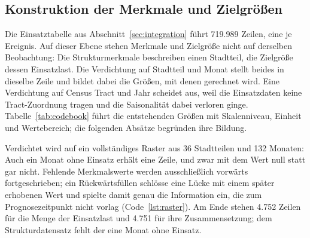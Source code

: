 \documentclass[12pt,a4paper]{article}
\begin{document}

\subsection{Konstruktion der Merkmale und Zielgrößen}
\label{sec:merkmale}
Die Einsatztabelle aus Abschnitt~\ref{sec:integration} führt 719.989 Zeilen,
eine je Ereignis. Auf dieser Ebene stehen Merkmale und Zielgröße nicht auf
derselben Beobachtung: Die Strukturmerkmale beschreiben einen Stadtteil, die
Zielgröße dessen Einsatzlast. Die Verdichtung auf Stadtteil und Monat stellt
beides in dieselbe Zeile und bildet dabei die Größen, mit denen gerechnet wird.
Eine Verdichtung auf Census Tract und Jahr scheidet aus, weil die Einsatzdaten
keine Tract-Zuordnung tragen und die Saisonalität dabei verloren ginge.
Tabelle~\ref{tab:codebook} führt die entstehenden Größen mit Skalenniveau,
Einheit und Wertebereich; die folgenden Absätze begründen ihre Bildung.
 
Verdichtet wird auf ein vollständiges Raster aus 36 Stadtteilen und 132
Monaten: Auch ein Monat ohne Einsatz erhält eine Zeile, und zwar mit dem Wert
null statt gar nicht. Fehlende Merkmalswerte werden ausschließlich vorwärts
fortgeschrieben; ein Rückwärtsfüllen schlösse eine Lücke mit einem später
erhobenen Wert und spielte damit genau die Information ein, die zum
Prognosezeitpunkt nicht vorlag (Code~\ref{lst:raster}). Am Ende stehen
4.752 Zeilen für die Menge der Einsatzlast und
4.751 für ihre Zusammensetzung; dem Strukturdatensatz fehlt der eine Monat ohne
Einsatz.
 
\end{document}
